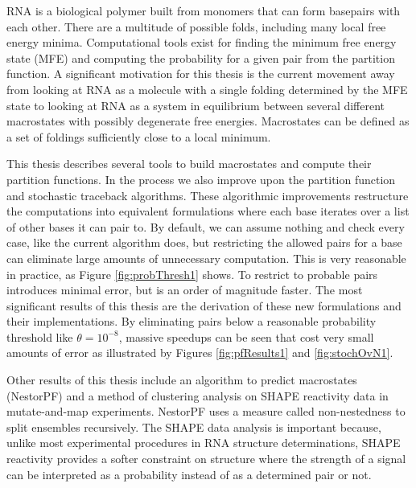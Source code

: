 RNA is a biological polymer built from monomers that can form
basepairs with each other. There are a multitude of possible folds,
including many local free energy minima. Computational tools exist for
finding the minimum free energy state (MFE) and computing the
probability for a given pair from the partition function. A
significant motivation for this thesis is the current movement away
from looking at RNA as a molecule with a single folding determined by
the MFE state to looking at RNA as a system in equilibrium between
several different macrostates with possibly degenerate free
energies. Macrostates can be defined as a set of foldings sufficiently
close to a local minimum.

This thesis describes several tools to build macrostates and compute
their partition functions. In the process we also improve upon the
partition function and stochastic traceback algorithms. These
algorithmic improvements restructure the computations into equivalent
formulations where each base iterates over a list of other bases it
can pair to. By default, we can assume nothing and check every case,
like the current algorithm does, but restricting the allowed pairs for
a base can eliminate large amounts of unnecessary computation. This is
very reasonable in practice, as Figure \ref{fig:probThresh1} shows.
To restrict to probable pairs introduces minimal error, but is an
order of magnitude faster. The most significant results of this thesis
are the derivation of these new formulations and their
implementations. By eliminating pairs below a reasonable probability
threshold like $\theta = 10^{-8}$, massive speedups can be seen that
cost very small amounts of error as illustrated by Figures
\ref{fig:pfResults1} and \ref{fig:stochOvN1}.

Other results of this thesis include an algorithm to predict
macrostates (NestorPF) and a method of clustering analysis on SHAPE
reactivity data in mutate-and-map experiments. NestorPF uses a measure
called non-nestedness to split ensembles recursively. The SHAPE data
analysis is important because, unlike most experimental procedures in
RNA structure determinations, SHAPE reactivity provides a softer
constraint on structure where the strength of a signal can be
interpreted as a probability instead of as a determined pair or not. 

